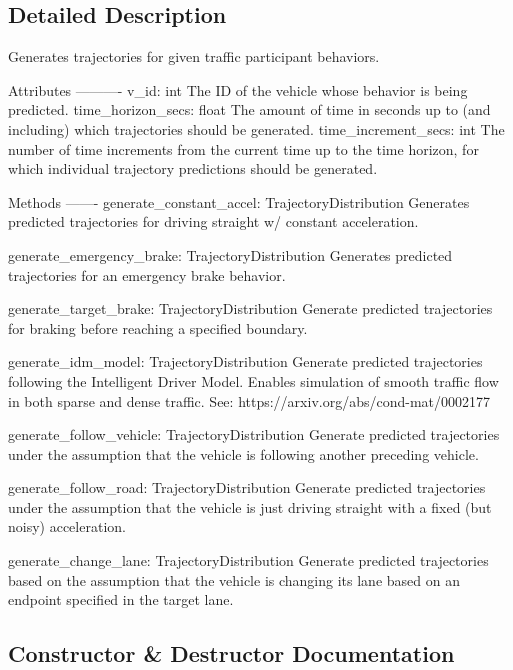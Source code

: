 \subsection{Detailed Description}
\begin{DoxyVerb}Generates trajectories for given traffic participant behaviors.

Attributes
----------
v_id: int
    The ID of the vehicle whose behavior is being predicted.
time_horizon_secs: float
    The amount of time in seconds up to (and including) which trajectories should be generated.
time_increment_secs: int
    The number of time increments from the current time up to the time horizon,
    for which individual trajectory predictions should be generated.

Methods
-------
generate_constant_accel: TrajectoryDistribution
    Generates predicted trajectories for driving straight w/ constant acceleration.

generate_emergency_brake: TrajectoryDistribution
    Generates predicted trajectories for an emergency brake behavior.

generate_target_brake: TrajectoryDistribution
    Generate predicted trajectories for braking before reaching a specified boundary.

generate_idm_model: TrajectoryDistribution
    Generate predicted trajectories following the Intelligent Driver Model.
    Enables simulation of smooth traffic flow in both sparse and dense traffic.
    See: https://arxiv.org/abs/cond-mat/0002177

generate_follow_vehicle: TrajectoryDistribution
    Generate predicted trajectories under the assumption that the vehicle 
    is following another preceding vehicle.

generate_follow_road: TrajectoryDistribution
    Generate predicted trajectories under the assumption that the vehicle
    is just driving straight with a fixed (but noisy) acceleration.

generate_change_lane: TrajectoryDistribution
    Generate predicted trajectories based on the assumption that
    the vehicle is changing its lane based on an endpoint specified
    in the target lane.\end{DoxyVerb}
 

\subsection{Constructor \& Destructor Documentation}
\mbox{\label{classimplementation_1_1trajectory__gen_1_1trajectory__generation_1_1_trajectory_generator_ad143765e7c7c4e2eaca2197fd173b145}} 
